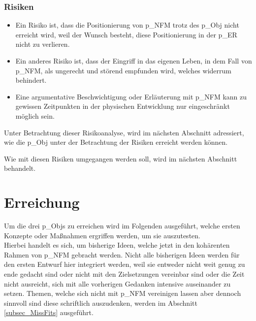 \subsubsection{Risiken}
\begin{itemize}
	\item Ein Risiko ist, dass die Positionierung von \gls{p_NFM} trotz des \gls{p_Obj} nicht erreicht wird, weil der Wunsch besteht, diese Positionierung in der \gls{p_ER} nicht zu verlieren. 
	\item Ein anderes Risiko ist, dass der Eingriff in das eigenen Leben, in dem Fall von \gls{p_NFM}, als ungerecht und störend empfunden wird, welches widerrum  behindert.
	\item Eine argumentative Beschwichtigung oder Erläuterung mit \gls{p_NFM} kann zu gewissen Zeitpunkten in der physischen Entwicklung nur eingeschränkt möglich sein.
\end{itemize}

Unter Betrachtung dieser Risikoanalyse, wird im nächsten Abschnitt adressiert, wie die \gls{p_Obj} unter der Betrachtung der Risiken erreicht werden können.

Wie mit diesen Risiken umgegangen werden soll, wird im nächsten Abschnitt behandelt.

\section{Erreichung}\label{sec:Erreichung}


Um die drei \glspl{p_Obj} zu erreichen wird im Folgenden ausgeführt, welche ersten Konzepte oder Maßnahmen ergriffen werden, um sie auszutesten.\\

Hierbei handelt es sich, um bisherige Ideen, welche jetzt in den kohärenten Rahmen von \gls{p_NFM} gebracht werden. Nicht alle bisherigen Ideen werden für den ersten Entwurf hier integriert werden, weil sie entweder nicht weit genug zu ende gedacht sind oder nicht mit den Zielsetzungen vereinbar sind oder die Zeit nicht ausreicht, sich mit alle vorherigen Gedanken intensive auseinander zu setzen. Themen, welche sich nicht mit \gls{p_NFM} vereinigen lassen aber dennoch sinnvoll sind diese schriftlich auszudenken, werden im Abschnitt \ref{subsec_MissFits} ausgeführt.\\


